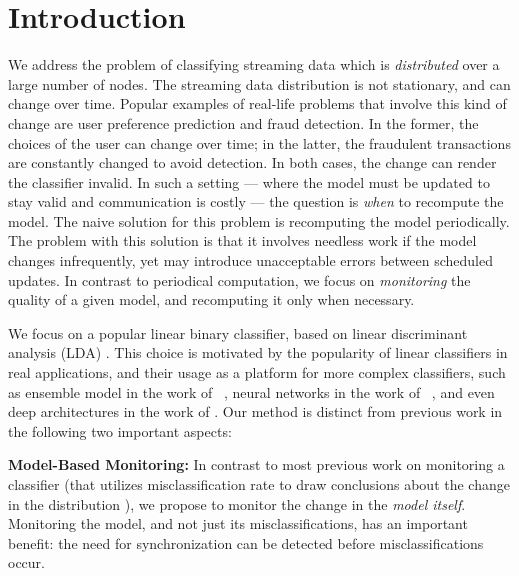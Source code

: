 \section{Introduction}

We address the problem of classifying streaming data which
is \textit{distributed} over a large number of nodes. The streaming data distribution is not stationary, and can change over time. Popular examples of real-life problems that involve this kind of change are user preference prediction and fraud detection. In the former, the choices of the user can change over time; in the latter, the fraudulent transactions are constantly changed to avoid detection. In both cases, the change can render the classifier invalid.
In such a setting --- where the model must be updated to stay valid and communication is costly --- the question is \textit{when} to recompute the model. The naive solution for this problem is recomputing the model periodically. The problem with this solution is that it involves needless work if the model changes infrequently, yet may introduce unacceptable errors between scheduled updates. 
In contrast to periodical computation, we focus on \textit{monitoring} the quality of a given model, and recomputing it only when necessary. 
\par We focus on a popular linear binary classifier, based on linear discriminant analysis (LDA) \cite{fisher1936use} . This choice is motivated by the popularity of linear classifiers in real applications, and their usage as a platform for more complex classifiers, such as ensemble model in the work of ~\cite{Deva, eSVM}, neural networks in the work of ~\cite{osadchy2015k}, 
and even deep architectures in the work of \cite{ROSS}. Our method is distinct from previous work in the following two important aspects:

\noindent \textbf{Model-Based Monitoring:} 
In contrast to most previous work on monitoring a classifier (that utilizes misclassification rate to draw conclusions about the change in the distribution 
\cite{baena2006early, gama2004learning, nishida2007detecting}), we propose to monitor the change in the \textit{model itself}.
Monitoring the model, and not just its misclassifications, has an important benefit: the need for synchronization can be detected before misclassifications occur. 

